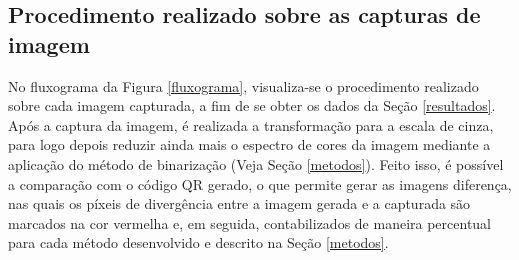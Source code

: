 \documentclass{ceel}
\begin{document}
\begin{multicols}{2}
\subsection{Procedimento realizado sobre as capturas de imagem}
No fluxograma da Figura \ref{fluxograma}, visualiza-se o procedimento realizado sobre cada imagem capturada, a fim de se obter os dados da Seção \ref{resultados}. Após a captura da imagem, é realizada a transformação para a escala de cinza, para logo depois reduzir ainda mais o espectro de cores da imagem mediante a aplicação do método de binarização (Veja Seção \ref{metodos}). Feito isso, é possível a comparação com o código QR gerado, o que permite gerar as imagens diferença, nas quais os píxeis de divergência entre a imagem gerada e a capturada são marcados na cor vermelha e, em seguida, contabilizados de maneira percentual para cada método desenvolvido e descrito na Seção \ref{metodos}.


\end{multicols}
\end{document}
